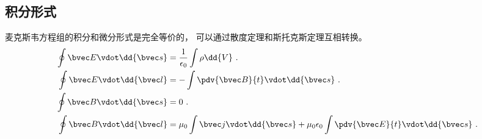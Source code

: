 \subsection{积分形式}
麦克斯韦方程组的积分和微分形式是完全等价的， 可以通过散度定理和斯托克斯定理互相转换。
\begin{align}
\oint \bvec E \vdot \dd{\bvec s} &= \frac{1}{\epsilon_0}\int \rho \dd{V}~.\\
\oint \bvec E \vdot \dd{\bvec l} &= -\int \pdv{\bvec B}{t} \vdot \dd{\bvec s}~.\\
\oint \bvec B \vdot \dd{\bvec s} &= 0~.\\
\oint \bvec B \vdot \dd{\bvec l} &= \mu_0 \int \bvec j \vdot \dd{\bvec s} + \mu_0 \epsilon_0 \int \pdv{\bvec E}{t} \vdot \dd{\bvec s}~.
\end{align}
